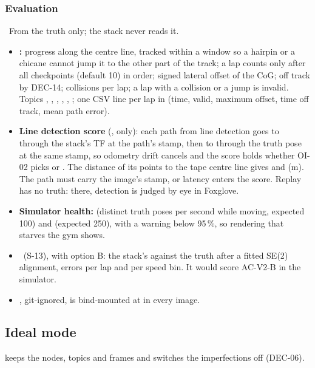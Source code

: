 \documentclass[11pt,a4paper]{article}
\newcommand{\planned}{\target{Planned}}
\newcommand{\deferred}{\target{Deferred}}
\begin{document}
\subsubsection{Evaluation}\label{sec:eval}
\planned\ From the truth only; the stack never reads it.
\begin{itemize}
  \item \textbf{:} progress along the centre line, tracked within a window so a hairpin or a chicane cannot jump it to the other part of the track; a lap counts only after all checkpoints (default 10) in order; signed lateral offset of the CoG; off track by DEC-14; collisions per lap; a lap with a collision or a jump is invalid. Topics  , , , , , ; one CSV line per lap in  (time, valid, maximum offset, time off track, mean path error).
  \item \textbf{Line detection score} (,  only): each path from line detection goes to  through the stack's TF at the path's stamp, then to  through the truth pose at the same stamp, so odometry drift cancels and the score holds whether OI-02 picks  or . The distance of its points to the tape centre line gives  and  (m). The path must carry the image's stamp, or latency enters the score. Replay has no truth: there, detection is judged by eye in Foxglove.
  \item \textbf{Simulator health:}  (distinct truth poses per second while moving, expected 100) and  (expected 250), with a warning below 95\,\%, so rendering that starves the gym shows.
  \item \textbf{} \deferred\ (S-13), with option B: the stack's \arrowto{} against the truth after a fitted SE(2) alignment, errors per lap and per speed bin. It would score AC-V2-B in the simulator.
  \item {}, git-ignored, is bind-mounted at  in every image.
\end{itemize}

\subsection{Ideal mode}
 keeps the nodes, topics and frames and switches the imperfections off (DEC-06).
\end{document}
